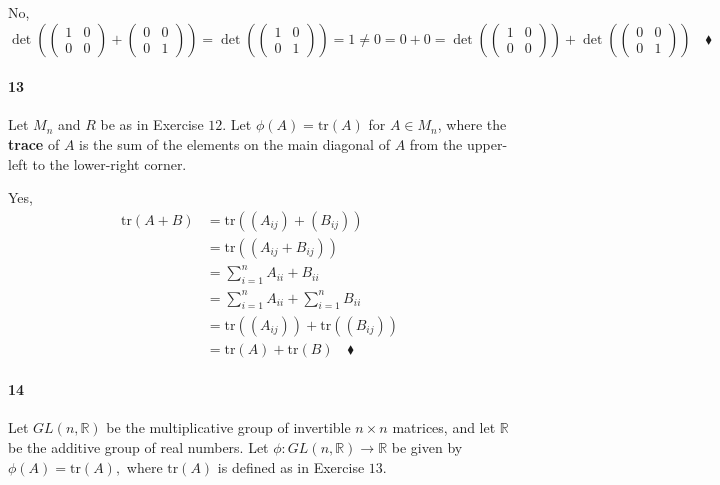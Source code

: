 \documentclass{article}
\newcommand\R{\mathbb{R}}
\begin{document}
 No, $\det\left(\begin{pmatrix}1&0\\
  0&0\end{pmatrix}+\begin{pmatrix}0&0\\ 0&1\end{pmatrix}\right)=
\det\left(\begin{pmatrix}1&0\\ 0&1\end{pmatrix}\right) = 1\neq 0 = 0+0 = \det\left(\begin{pmatrix}1&0\\ 0&0\end{pmatrix}\right)+\det\left(\begin{pmatrix}0&0\\ 0&1\end{pmatrix}\right) \quad \blacklozenge$

\newpage
\paragraph{13} Let $M_n$ and $R$ be as in Exercise $12$. Let
$\phi(A)=\text{tr}(A)$ for $A\in M_n$, where the \textbf{trace} of $A$
is the sum of the elements on the main diagonal of $A$ from the upper-left to the lower-right corner.

 Yes,
\begin{align*}
  \text{tr}(A+B) &= \text{tr}((A_{ij})+(B_{ij}))\\
                 &= \text{tr}((A_{ij}+B_{ij})) \\
                 &= \sum_{i=1}^n A_{ii} + B_{ii}\\
                 &= \sum_{i=1}^n A_{ii} + \sum_{i=1}^n B_{ii}\\
                 &= \text{tr}((A_{ij})) + \text{tr}((B_{ij})) \\
                 &= \text{tr}(A) + \text{tr}(B) \quad \blacklozenge
\end{align*}

\paragraph{14} Let $GL(n,\R)$ be the multiplicative group of
invertible $n\times n$ matrices, and let $\R$ be the additive group of
real numbers. Let $\phi: GL(n,\R)\rightarrow \R$ be given by $\phi(A)
= \text{tr}(A),$ where $\text{tr}(A)$ is defined as in Exercise $13.$
\end{document}
